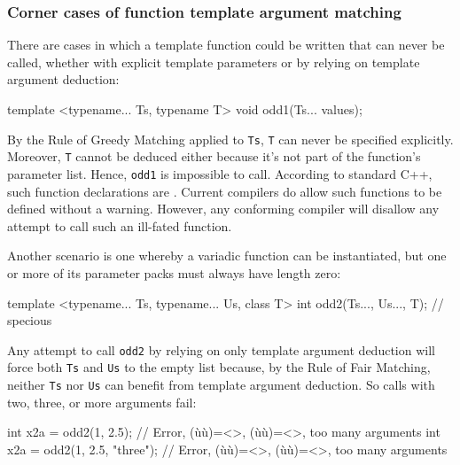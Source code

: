 \subsubsection[Corner cases of function template argument matching]{Corner cases of function template argument matching}\label{corner-cases-of-function-template-argument-matching}

There are cases in which a template function could be written that can
never be called, whether with explicit template parameters or by relying
on template argument deduction:

\begin{emcppslisting}
template <typename... Ts, typename T>
void odd1(Ts... values);
\end{emcppslisting}
    

\noindent By the Rule of Greedy Matching applied to \lstinline!Ts!, \lstinline!T! can
never be specified explicitly. Moreover, \lstinline!T! cannot be deduced
either because it's not part of the function's parameter list. Hence,
\lstinline!odd1! is impossible to call. According to standard C++, such
function declarations are . Current compilers do allow such functions to be defined
without a warning. However, any conforming compiler will disallow any
attempt to call such an ill-fated function.

Another scenario is one whereby a variadic function can be instantiated,
but one or more of its parameter packs must always have length zero:

\begin{emcppslisting}[emcppsbatch=e22]
template <typename... Ts, typename... Us, class T>
int odd2(Ts..., Us..., T);  // specious
\end{emcppslisting}
    

\noindent Any attempt to call \lstinline!odd2! by relying on only template argument
deduction will force both \lstinline!Ts! and \lstinline!Us! to the empty list
because, by the Rule of Fair Matching, neither \lstinline!Ts! nor
\lstinline!Us! can benefit from template argument deduction. So calls with
two, three, or more arguments fail:

\begin{emcppslisting}[emcppsbatch=e22]
int x2a = odd2(1, 2.5);           // Error, (ù{}ù)=<>, (ù{}ù)=<>, too many arguments
int x2a = odd2(1, 2.5, "three");  // Error, (ù{}ù)=<>, (ù{}ù)=<>, too many arguments
\end{emcppslisting}
    

